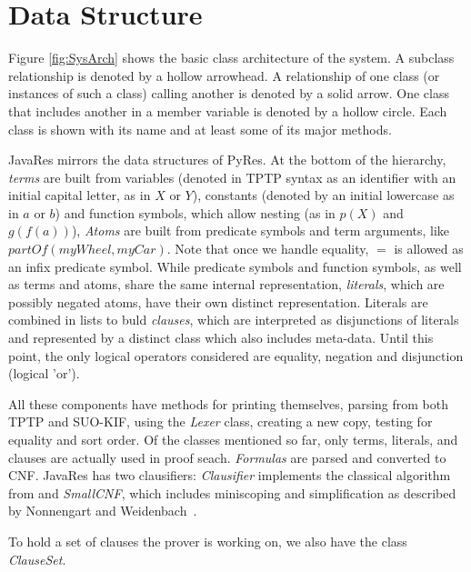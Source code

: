 \documentclass{llncs}
\begin{document}
\section{Data Structure}

Figure \ref{fig:SysArch} shows the basic class architecture of the
system. A subclass relationship is denoted by a hollow arrowhead.  A
relationship of one class (or instances of such a class) calling
another is denoted by a solid arrow.  One class that includes another
in a member variable is denoted by a hollow circle.  Each class is
shown with its name and at least some of its major methods.

JavaRes mirrors the data structures of PyRes.  At the bottom of the
hierarchy, \emph{terms} are built from variables (denoted in TPTP
syntax as an identifier with an initial capital letter, as in $X$ or
$Y$), constants (denoted by an initial lowercase as in $a$ or $b$) and
function symbols, which allow nesting (as in $p(X)$ and $g(f(a))$),
\emph{Atoms} are built from predicate symbols and term arguments, like
$partOf(myWheel,myCar)$.  Note that once we handle equality, $=$ is
allowed as an infix predicate symbol. While predicate symbols and
function symbols, as well as terms and atoms, share the same internal
representation, \emph{literals}, which are possibly negated atoms,
have their own distinct representation. Literals are combined in lists
to buld \emph{clauses}, which are interpreted as disjunctions of
literals and represented by a distinct class which also includes
meta-data.  Until this point, the only logical operators considered
are equality, negation and disjunction (logical 'or').

All these components have methods for printing themselves, parsing
from both TPTP and SUO-KIF, using the \emph{Lexer} class, creating a new
copy, testing for equality and sort order. Of the classes mentioned so
far, only terms, literals, and clauses are actually used in proof
seach.  \emph{Formulas} are parsed and converted to CNF.  JavaRes has
two clausifiers: \emph{Clausifier} implements the classical algorithm
from \cite{RN:AI-95} and \emph{SmallCNF}, which includes miniscoping
and simplification as described by Nonnengart and
Weidenbach~\cite{NW:SmallCNF-2001}.

To hold a set of clauses the prover is working on, we also have the
class \emph{ClauseSet}.
\end{document}
